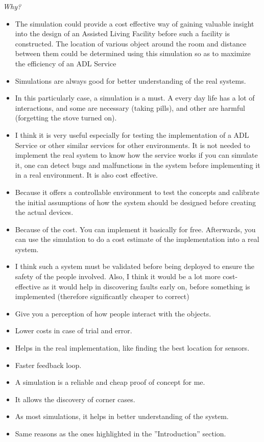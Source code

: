 \emph{Why?}
\begin{itemize}
	\item The simulation could provide a cost effective way of gaining valuable insight into the design of an Assisted Living Facility before such a facility is constructed. The location of various object around the room and distance between them could be determined using this simulation so as to maximize the efficiency of an ADL Service
	\item Simulations are always good for better understanding of the real systems. 
	\item In this particularly case, a simulation is a must. A every day life has a lot of interactions, and some are necessary (taking pills), and other are harmful (forgetting the stove turned on).
	\item I think it is very useful especially for testing the implementation of a ADL Service or other similar services for other environments. It is not needed to implement the real system to know how the service works if you can simulate it, one can detect bugs and malfunctions in the system before implementing it in a real environment. It is also cost effective.
	\item Because it offers a controllable environment to test the concepts and calibrate the initial assumptions of how the system should be designed before creating the actual devices.
	\item Because of the cost. You can implement it basically for free. Afterwards, you can use the simulation to do a cost estimate of the implementation into a real system.
	\item I think such a system must be validated before being deployed to ensure the safety of the people involved. Also, I think it would be a lot more cost-effective as it would help in discovering faults early on, before something is implemented (therefore significantly cheaper to correct)
	\item Give you a perception of how people interact with the objects.
	\item Lower costs in case of trial and error.
	\item Helps in the real implementation, like finding the best location for sensors.
	\item Faster feedback loop.
	\item A simulation is a reliable and cheap proof of concept for me.
	\item It allows the discovery of corner cases. 
	\item As most simulations, it helps in better understanding of the system.
	\item Same reasons as the ones highlighted in the ''Introduction'' section.
\end{itemize}

